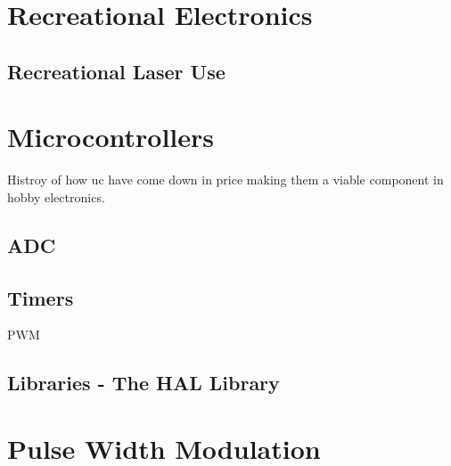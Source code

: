 
\section{Recreational Electronics}


\subsection{Recreational Laser Use}

\section{Microcontrollers}
Histroy of how uc have come down in price making them a viable component in hobby electronics.

\subsection{ADC}

\subsection{Timers}
PWM

\subsection{Libraries - The HAL Library}



\section{Pulse Width Modulation}







